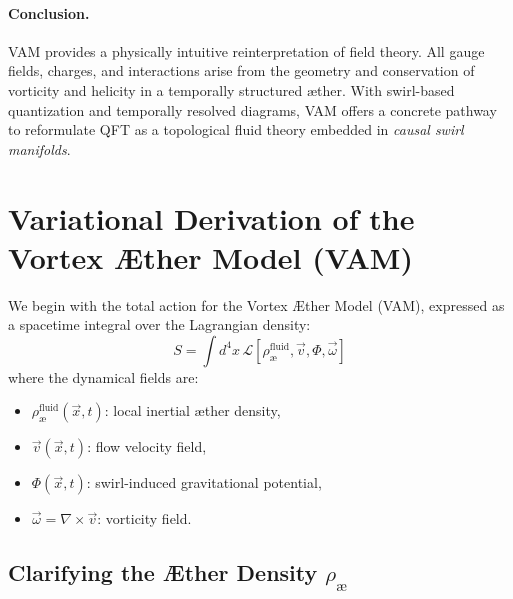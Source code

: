 \documentclass[12pt]{article}
\begin{document}
\paragraph{Conclusion.} VAM provides a physically intuitive reinterpretation of field theory. All gauge fields, charges, and interactions arise from the geometry and conservation of vorticity and helicity in a temporally structured æther. With swirl-based quantization and temporally resolved diagrams, VAM offers a concrete pathway to reformulate QFT as a topological fluid theory embedded in \textit{causal swirl manifolds}.
\section{Variational Derivation of the Vortex \AE ther Model (VAM)}

We begin with the total action for the Vortex \AE ther Model (VAM), expressed as a spacetime integral over the Lagrangian density:
\begin{equation}
    S = \int d^4x \, \mathcal{L}[\rho_\text{\ae}^{\text{fluid}}, \vec{v}, \Phi, \vec{\omega}]
\end{equation}
where the dynamical fields are:
\begin{itemize}
    \item $\rho_\text{\ae}^{\text{fluid}}(\vec{x}, t)$: local inertial æther density,
    \item $\vec{v}(\vec{x}, t)$: flow velocity field,
    \item $\Phi(\vec{x}, t)$: swirl-induced gravitational potential,
    \item $\vec{\omega} = \nabla \times \vec{v}$: vorticity field.
\end{itemize}

\subsection*{Clarifying the Æther Density \( \rho_\text{\ae} \)}
\end{document}
